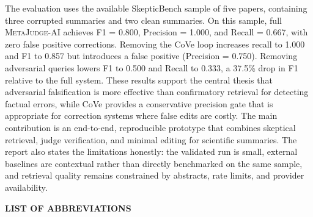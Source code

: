\documentclass[12pt, a4paper]{report}
\newcommand{\sys}{\textsc{MetaJudge-AI}}
\begin{document}
\vspace{0.4cm}
\noindent
The evaluation uses the available SkepticBench sample of five papers, containing
three corrupted summaries and two clean summaries. On this sample, full
\sys{} achieves F1 = 0.800, Precision = 1.000, and Recall = 0.667, with zero
false positive corrections. Removing the CoVe loop increases recall to 1.000
and F1 to 0.857 but introduces a false positive (Precision = 0.750). Removing
adversarial queries lowers F1 to 0.500 and Recall to 0.333, a 37.5\% drop in
F1 relative to the full system. These results support the central thesis that
adversarial falsification is more effective than confirmatory retrieval for
detecting factual errors, while CoVe provides a conservative precision gate that
is appropriate for correction systems where false edits are costly.
\vspace{0.4cm}
\noindent
The main contribution is an end-to-end, reproducible prototype that combines
skeptical retrieval, judge verification, and minimal editing for scientific
summaries. The report also states the limitations honestly: the validated run is
small, external baselines are contextual rather than directly benchmarked on the
same sample, and retrieval quality remains constrained by abstracts, rate
limits, and provider availability.
\newpage
\listoftables
\cleardoublepage
\listoffigures
\cleardoublepage

\newpage
\begin{center}
    {\fontsize{16}{20}\bfseries LIST OF ABBREVIATIONS}
\end{center}
\vspace{1cm}
\onehalfspacing
\end{document}
